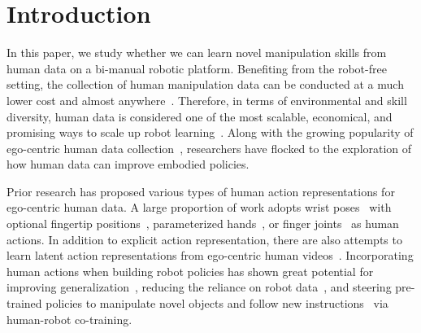 \section{Introduction}

In this paper, we study whether we can learn novel manipulation skills from human data on a bi-manual robotic platform.
% 
Benefiting from the robot-free setting, the collection of human manipulation data can be conducted at a much lower cost and almost anywhere~\cite{generalist2025gen0,grauman2022ego4d}.
% 
Therefore, in terms of environmental and skill diversity, human data is considered one of the most scalable, economical, and promising ways to scale up robot learning~\cite{hoque2025egodex,generalist2025gen0,zheng2026egoscale}.
% 
Along with the growing popularity of ego-centric human data collection~\cite{grauman2022ego4d,hoque2025egodex,grauman2024ego}, researchers have flocked to the exploration of how human data can improve embodied policies.


Prior research has proposed various types of human action representations for ego-centric human data.
% 
A large proportion of work adopts wrist poses~\cite{kareer2025egomimic,zhu2026emma,punamiya2025egobridge,cheang2025gr3,kareer2025emergence} with optional fingertip positions~\cite{cai2025n,qiu2025humanoid}, parameterized hands~\cite{romero2022embodied,luo2025being,luo2026being,yang2025egovla}, or finger joints~\cite{zheng2026egoscale} as human actions.
% 
In addition to explicit action representation, there are also attempts to learn latent action representations from ego-centric human videos~\cite{chen2025moto,fan2025xr,bruce2024genie,ye2024latent}.
% 
Incorporating human actions when building robot policies has shown great potential for improving generalization~\cite{kareer2025egomimic,punamiya2025egobridge,cai2025n}, reducing the reliance on robot data~\cite{zheng2026egoscale,bi2026h}, and steering pre-trained policies to manipulate novel objects and follow new instructions~\cite{cheang2025gr3,kareer2025emergence,yuan2025motiontrans} via human-robot co-training.




